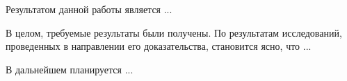 \startconclusionpage


Результатом данной работы является ...

В целом, требуемые результаты были получены. По результатам исследований, проведенных в направлении его доказательства, становится ясно, что ...

В дальнейшем планируется ...